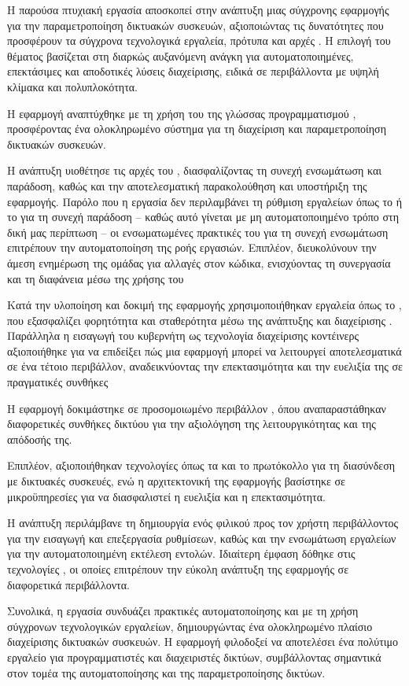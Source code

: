 Η παρούσα πτυχιακή εργασία αποσκοπεί στην ανάπτυξη μιας σύγχρονης 
εφαρμογής για την παραμετροποίηση δικτυακών συσκευών, αξιοποιώντας 
τις δυνατότητες που προσφέρουν τα σύγχρονα τεχνολογικά εργαλεία, 
πρότυπα και αρχές . 
Η επιλογή του θέματος βασίζεται στη διαρκώς αυξανόμενη ανάγκη 
για αυτοματοποιημένες, επεκτάσιμες και αποδοτικές λύσεις διαχείρισης, 
ειδικά σε περιβάλλοντα με υψηλή κλίμακα και πολυπλοκότητα.

Η εφαρμογή αναπτύχθηκε με τη χρήση του  της 
γλώσσας προγραμματισμού , προσφέροντας ένα ολοκληρωμένο  
σύστημα για τη διαχείριση και παραμετροποίηση δικτυακών συσκευών. 

Η ανάπτυξη υιοθέτησε τις αρχές του , 
διασφαλίζοντας τη συνεχή ενσωμάτωση και παράδοση, 
καθώς και την αποτελεσματική παρακολούθηση και 
υποστήριξη της εφαρμογής. Παρόλο που η εργασία δεν περιλαμβάνει τη 
ρύθμιση εργαλείων όπως το  ή το  
για τη συνεχή παράδοση – καθώς αυτό γίνεται με μη αυτοματοποιημένο τρόπο στη δική μας περίπτωση – 
οι ενσωματωμένες πρακτικές του  για τη συνεχή 
ενσωμάτωση επιτρέπουν την αυτοματοποίηση της ροής εργασιών. 
Επιπλέον, διευκολύνουν την άμεση ενημέρωση της ομάδας για αλλαγές 
στον κώδικα, ενισχύοντας τη συνεργασία και τη διαφάνεια μέσω της 
χρήσης του 

Κατά την υλοποίηση και δοκιμή της εφαρμογής χρησιμοποιήθηκαν εργαλεία όπως το , 
που εξασφαλίζει φορητότητα και σταθερότητα μέσω της ανάπτυξης και διαχείρισης . 
Παράλληλα η εισαγωγή του κυβερνήτη ως τεχνολογία διαχείρισης κοντέινερς αξιοποιήθηκε 
για να επιδείξει πώς μια εφαρμογή μπορεί να λειτουργεί αποτελεσματικά σε ένα τέτοιο περιβάλλον, 
αναδεικνύοντας την επεκτασιμότητα και την ευελιξία της σε πραγματικές συνθήκες

Η εφαρμογή δοκιμάστηκε σε προσομοιωμένο περιβάλλον , 
όπου αναπαραστάθηκαν διαφορετικές συνθήκες δικτύου για την 
αξιολόγηση της λειτουργικότητας και της απόδοσής της.

Επιπλέον, αξιοποιήθηκαν τεχνολογίες όπως τα  
και το πρωτόκολλο  για τη διασύνδεση με δικτυακές συσκευές, 
ενώ η αρχιτεκτονική της εφαρμογής βασίστηκε σε μικροϋπηρεσίες 
για να διασφαλιστεί η ευελιξία και η επεκτασιμότητα. 

Η ανάπτυξη περιλάμβανε τη δημιουργία ενός φιλικού προς τον χρήστη 
περιβάλλοντος για την εισαγωγή και επεξεργασία ρυθμίσεων, καθώς και 
την ενσωμάτωση εργαλείων για την αυτοματοποιημένη εκτέλεση εντολών. 
Ιδιαίτερη έμφαση δόθηκε στις τεχνολογίες , 
οι οποίες επιτρέπουν την εύκολη ανάπτυξη της εφαρμογής σε διαφορετικά περιβάλλοντα.

Συνολικά, η εργασία συνδυάζει πρακτικές αυτοματοποίησης και  
με τη χρήση σύγχρονων τεχνολογικών εργαλείων, δημιουργώντας ένα 
ολοκληρωμένο πλαίσιο διαχείρισης δικτυακών συσκευών. 
Η εφαρμογή φιλοδοξεί να αποτελέσει ένα πολύτιμο εργαλείο 
για προγραμματιστές και διαχειριστές δικτύων, συμβάλλοντας 
σημαντικά στον τομέα της αυτοματοποίησης και της παραμετροποίησης 
δικτύων.